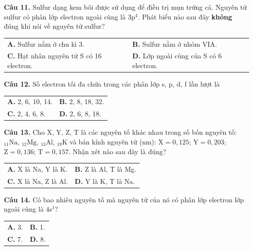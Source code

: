 \documentclass{article}
\begin{document}
\fontsize{30}{39}\selectfont
\textbf{Câu 11.} Sulfur dạng kem bôi được sử dụng để điều trị mụn trứng cá. Nguyên tử sulfur có phân lớp electron ngoài cùng là $3\text{p}^4$. Phát biểu nào sau đây \textbf{không} đúng khi nói về nguyên tử sulfur?
\vspace{6pt}

\begin{tabularx}{\linewidth}{@{}X X@{}}
\textbf{A.} Sulfur nằm ở chu kì 3. & \textbf{B.} Sulfur nằm ở nhóm VIA.\\[8pt]
\textbf{C.} Hạt nhân nguyên tử S có 16 electron. & \textbf{D.} Lớp ngoài cùng của S có 6 electron.
\end{tabularx}

\vspace*{\fill}

\textbf{Câu 12.} Số electron tối đa chứa trong các phân lớp s, p, d, f lần lượt là
\vspace{8pt}

\begin{tabularx}{\linewidth}{@{}X X@{}}
\textbf{A.} 2, 6, 10, 14. & \textbf{B.} 2, 8, 18, 32.\\[8pt]
\textbf{C.} 2, 4, 6, 8. & \textbf{D.} 2, 6, 8, 18.
\end{tabularx}
\vspace*{\fill}
\newpage

\fontsize{30}{39}\selectfont
\textbf{Câu 13.} Cho X, Y, Z, T là các nguyên tố khác nhau trong số bốn nguyên tố: $_{11}\text{Na}$, $_{12}\text{Mg}$, $_{13}\text{Al}$, $_{19}\text{K}$ và bán kính nguyên tử (nm): $\text{X} = 0,125$; $\text{Y} = 0,203$; $\text{Z} = 0,136$; $\text{T} = 0,157$. Nhận xét nào sau đây là đúng?
\vspace{6pt}

\begin{tabularx}{\linewidth}{@{}X X@{}}
\textbf{A.} X là Na, Y là K. & \textbf{B.} Z là Al, T là Mg.\\[8pt]
\textbf{C.} X là Na, Z là Al. & \textbf{D.} Y là K, T là Na.
\end{tabularx}

\vspace*{\fill}

\textbf{Câu 14.} Có bao nhiêu nguyên tố mà nguyên tử của nó có phân lớp electron lớp ngoài cùng là $4\text{s}^1$?
\vspace{8pt}

\begin{tabularx}{\linewidth}{@{}X X@{}}
\textbf{A.} 3. & \textbf{B.} 1.\\[8pt]
\textbf{C.} 7. & \textbf{D.} 8.
\end{tabularx}
\vspace*{\fill}
\newpage
\end{document}
